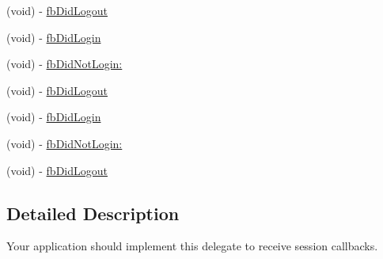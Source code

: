 \begin{DoxyCompactItemize}
(void) -\/ \hyperlink{protocol_f_b_session_delegate-p_a26f8c3d8a55718a2cb0b59f262cd620f}{fb\-Did\-Logout}
\item 
(void) -\/ \hyperlink{protocol_f_b_session_delegate-p_ab12acc7e3f693dcbf5f9ffe51fdf0b6d}{fb\-Did\-Login}
\item 
(void) -\/ \hyperlink{protocol_f_b_session_delegate-p_aa6e3356a2554da580a58d3edbfa777e1}{fb\-Did\-Not\-Login\-:}
\item 
(void) -\/ \hyperlink{protocol_f_b_session_delegate-p_a26f8c3d8a55718a2cb0b59f262cd620f}{fb\-Did\-Logout}
\item 
(void) -\/ \hyperlink{protocol_f_b_session_delegate-p_ab12acc7e3f693dcbf5f9ffe51fdf0b6d}{fb\-Did\-Login}
\item 
(void) -\/ \hyperlink{protocol_f_b_session_delegate-p_aa6e3356a2554da580a58d3edbfa777e1}{fb\-Did\-Not\-Login\-:}
\item 
(void) -\/ \hyperlink{protocol_f_b_session_delegate-p_a26f8c3d8a55718a2cb0b59f262cd620f}{fb\-Did\-Logout}
\end{DoxyCompactItemize}


\subsection{\-Detailed \-Description}
\-Your application should implement this delegate to receive session callbacks. 

